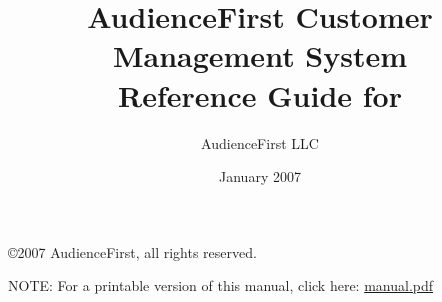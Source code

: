 \documentclass{article}
\title{AudienceFirst Customer Management System \\ 
Reference Guide for \venue}
\author{AudienceFirst LLC}
\date{January 2007}
\begin{document}

\copyright{2007 AudienceFirst, all rights reserved.} 

\maketitle

NOTE: For a printable version of this manual, click here:
\url{manual.pdf}

\tableofcontents









\end{document}
